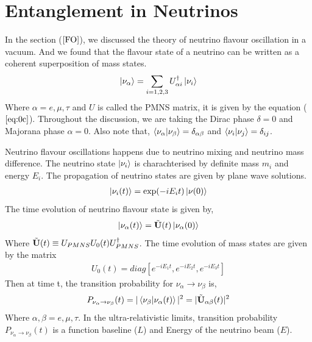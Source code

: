 \documentclass[12pt,a4paper]{report}
\begin{document}
\section{Entanglement in Neutrinos}
In the section ($\ref{FO}$), we discussed the theory of neutrino flavour oscillation in a vacuum. And we found that the flavour state of a neutrino can be written as a coherent superposition of mass states. 
\begin{equation}
\label{eq:0a}
	\ket{\nu_{\alpha}}=\sum_{i = 1,2,3} U^{\dagger} _{\alpha i}\ket{\nu_{i}}
\end{equation}
Where $\alpha = e,\mu,\tau$ and $U$ is called the PMNS matrix, it is given by the equation ($\ref{eq:0c}$). Throughout the discussion, we are taking the Dirac phase $\delta=0$ and Majorana phase $\alpha=0$. Also note that, $\braket{\nu_{\alpha}|\nu_{\beta}} = \delta_{\alpha\beta}$ and $\braket{\nu_{i}|\nu_{j}} = \delta_{ij}$.\par Neutrino flavour oscillations happens due to neutrino mixing and neutrino mass difference. The neutrino state $\ket{\nu_{i}}$ is charachterised by definite mass $m_{i}$ and energy $E_{i}$. The propagation of neutrino states are given by plane wave solutions.
\begin{gather*}
 \ket{\nu_{i}(t)} = \exp(-iE_{i}t)\ket{\nu(0)}   
\end{gather*}
The time evolution of neutrino flavour state is given by,
\begin{equation}
\label{eq:21}
\ket{\nu_{\alpha}(t)} =\Tilde{\textbf{U}}(t)\ket{\nu_{\alpha}(0)}
\end{equation}
Where $\Tilde{\textbf{U}}(t) \equiv U_{PMNS} U_{0}(t)U_{PMNS}^{\dagger}$. The time evolution of mass states are given by the matrix
\begin{gather*}
  U_{0}(t) = diag[e^{-iE_{1}t}, e^{-iE_{2}t}, e^{-iE_{3}t}]  
\end{gather*}
Then at time t, the transition probability for $\nu_{\alpha} \rightarrow \nu_{\beta}$ is,
\begin{equation}
\label{eq:21b}
P_{\nu_{\alpha} \rightarrow \nu_{\beta}}(t) = |\braket{\nu_{\beta}|\nu_{\alpha}(t)}|^{2} = |\Tilde{\textbf{U}}_{\alpha\beta}(t)|^{2}
\end{equation}
Where $\alpha,\beta = e,\mu,\tau$. In the ultra-relativistic limits, transition probability $P_{\nu_{\alpha} \rightarrow \nu_{\beta}}(t)$ is a function baseline ($L$) and Energy of the neutrino beam ($E$).\par
\end{document}
